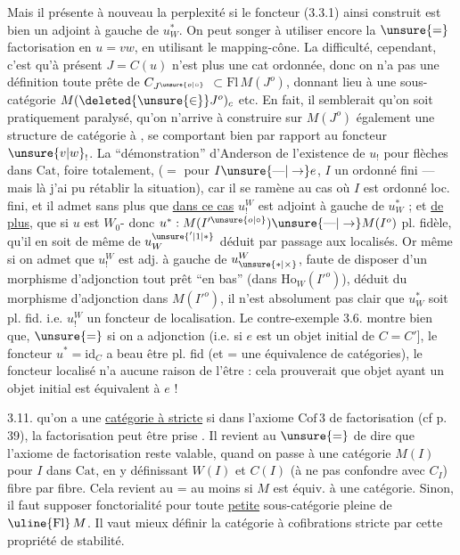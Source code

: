Mais il  présente à nouveau la perplexité
si le foncteur (3.3.1) ainsi construit
est bien un adjoint à gauche de $u_W^*$.
On peut songer à utiliser encore la
$\unsure{=}$ factorisation en $u=vw$, en utilisant
le mapping-cône. La difficulté, cependant,
c'est qu'à présent $J=C(u)$ n'est plus une
cat ordonnée, donc on n'a pas une
définition toute prête de  $C_{J^{\unsure{o|\circ}}}$
$\subset\mathrm{Fl}\, M(J^o)$, donnant lieu à
une sous-catégorie $M(\deleted{\unsure{\in}}J^o)_c$ etc. En
fait, il semblerait qu'on soit pratiquement
paralysé,  qu'on n'arrive à construire
sur $M(J^o)$ également une structure
de catégorie à , se comportant
bien par rapport au foncteur $\unsure{v|w}_!$.
La ``démonstration'' d'Anderson de l'existence
de $u_!$ pour \uline{} flèches dans $\mathrm{Cat}$,
foire totalement,  ($=$ pour $I\unsure{\text{---}|\to}e$,
$I$ un ordonné fini --- mais là j'ai
pu rétablir la situation), car il se ramène
au cas où $I$ est ordonné loc. fini, et il
admet sans plus que \uline{dans ce cas} $u_!^W$ est
adjoint à gauche de $u_W^*$ ; et \uline{de plus},
que si $u$ est $W_0$- donc
$u^*:M(I'^{\unsure{o|\circ}})\unsure{\text{---}|\to}M(I^o)$ pl. fidèle, qu'il en
soit de même de $u_W^{\unsure{'|1|*}}$ déduit par passage
aux localisés. Or même si on admet
que $u_!^W$ est adj. à gauche de $u_{\unsure{*|\times}}^W$,
faute de disposer d'un morphisme
d'adjonction tout prêt ``en bas'' (dans
$\mathrm{Ho}_W(I'^o)$), déduit du morphisme
d'adjonction dans $M(I'^o)$, il n'est
absolument pas clair que 
$u_W^*$ soit pl. fid. i.e. $u_!^W$ un foncteur
de localisation. Le contre-exemple 3.6.
montre bien que, $\unsure{=}$ si on a adjonction
(i.e. si $e$ est un objet initial de $C=C'$],
le foncteur $u^*=\mathrm{id}_C$ a beau être pl.
fid (et $\mathord{=}$ une équivalence de catégories),
le foncteur localisé n'a aucune raison
de l'être : cela prouverait que  objet
 ayant un objet initial est
 équivalent à $e$ !

3.11.  qu'on a une \uline{catégorie à 
stricte} si dans l'axiome $\mathrm{Cof}\,3$ de factorisation
(cf p. 39), la factorisation peut être prise
. Il revient \inserted{$\pm$} au $\unsure{=}$ de dire que
l'axiome de factorisation reste valable,
quand on passe à une catégorie $M(I)$
pour $I$ dans $\mathrm{Cat}$, en y définissant $W(I)$ et
$C(I)$ (à ne pas confondre avec $C_I$) fibre par
fibre. Cela revient au $\mathord{=}$  au moins si
$M$ est équiv. à une  catégorie. Sinon,
il faut supposer fonctorialité pour toute
\uline{petite} sous-catégorie pleine de $\uline{\mathrm{Fl}}\,M$.
Il vaut mieux définir la catégorie à cofibrations
stricte par cette propriété de stabilité.

